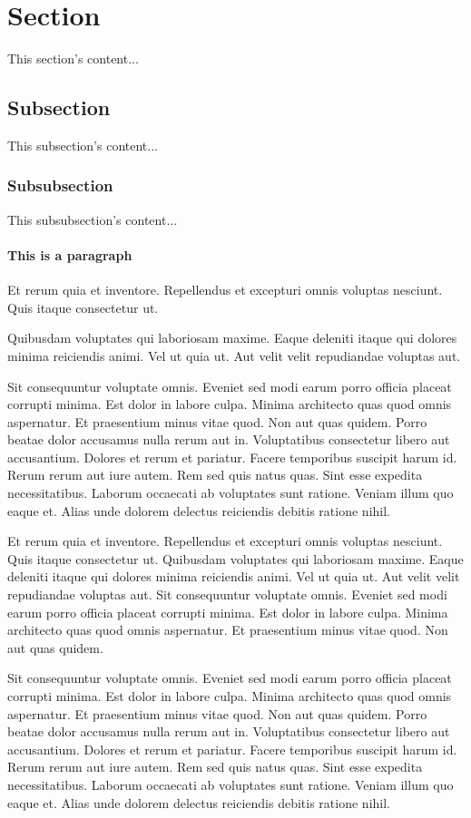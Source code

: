 \section{Section}
This section's content...

\subsection{Subsection}
This subsection's content...

\subsubsection{Subsubsection}
This subsubsection's content...

\paragraph{This is a paragraph}
Et rerum quia et inventore. Repellendus et excepturi omnis voluptas nesciunt. Quis itaque consectetur ut.

Quibusdam voluptates qui laboriosam maxime. Eaque deleniti itaque qui dolores minima reiciendis animi. Vel ut quia ut. Aut velit velit repudiandae voluptas aut.

Sit consequuntur voluptate omnis. Eveniet sed modi earum porro officia placeat corrupti minima. Est dolor in labore culpa. Minima architecto quas quod omnis aspernatur. Et praesentium minus vitae quod. Non aut quas quidem.
Porro beatae dolor accusamus nulla rerum aut in. Voluptatibus consectetur libero aut accusantium. Dolores et rerum et pariatur. Facere temporibus suscipit harum id. Rerum rerum aut iure autem.
Rem sed quis natus quas. Sint esse expedita necessitatibus. Laborum occaecati ab voluptates sunt ratione. Veniam illum quo eaque et. Alias unde dolorem delectus reiciendis debitis ratione nihil.

Et rerum quia et inventore. Repellendus et excepturi omnis voluptas nesciunt. Quis itaque consectetur ut.
Quibusdam voluptates qui laboriosam maxime. Eaque deleniti itaque qui dolores minima reiciendis animi. Vel ut quia ut. Aut velit velit repudiandae voluptas aut.
Sit consequuntur voluptate omnis. Eveniet sed modi earum porro officia placeat corrupti minima. Est dolor in labore culpa. Minima architecto quas quod omnis aspernatur. Et praesentium minus vitae quod. Non aut quas quidem.


Sit consequuntur voluptate omnis. Eveniet sed modi earum porro officia placeat corrupti minima. Est dolor in labore culpa. Minima architecto quas quod omnis aspernatur. Et praesentium minus vitae quod. Non aut quas quidem.
Porro beatae dolor accusamus nulla rerum aut in. Voluptatibus consectetur libero aut accusantium. Dolores et rerum et pariatur. Facere temporibus suscipit harum id. Rerum rerum aut iure autem.
Rem sed quis natus quas. Sint esse expedita necessitatibus. Laborum occaecati ab voluptates sunt ratione. Veniam illum quo eaque et. Alias unde dolorem delectus reiciendis debitis ratione nihil.

